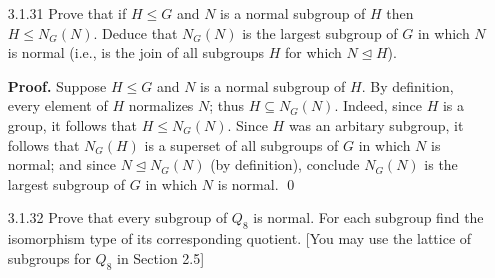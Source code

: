 \begin{enumerate}
      \textbf{Proof.} ($\Rightarrow$) Suppose first that $gN = Ng$. Let
      $n \in N$. Then since $ng \in Ng$ and $gN = Ng$, it follows that
      $ng = gn'$ for some $n' \in N$, so that $n = gn'g^{-1} \in gNg^{-1}$;
      i.e., $N \subseteq gNg^{-1}$. Now consider $m \in gNg^{-1}$. It follows
      that $m = gn''g^{-1}$ for some $n'' \in N$. Similarly, since $gn'' \in gN$
      and $gN = Ng$, we have that $gn'' = n_1g$ for some $n_1 \in N$, so that
      $m = gn''g^{-1} = n_1 \in N$. Thus, $gNg^{-1} \subseteq N$; conclude that
      $gNg^{-1} = N$; in other words, $g \in N_G(N)$.

      ($\Leftarrow$) Now suppose that $g \in N_G(N)$. By definition, we have
      that $gNg^{-1} = N$. Let $m \in gN$, so that $m = gn$ for some $n \in N$.
      It follows that $gng^{-1} = n'$ for some $n' \in N$ (because
      $gNg^{-1} = N$), so that $m = gn = n'g \in Ng$; that is $gN \subseteq Ng$.
      By a symmetric argument, we conclude that $Ng \subseteq gN$, so that
      $gN = Ng$. \qed
   \item[3.1.31]  Prove that if $H \le G$ and $N$ is a normal subgroup of $H$
                  then $H \le N_G(N)$. Deduce that $N_G(N)$ is the largest
                  subgroup of $G$ in which $N$ is normal (i.e., is the join of
                  all subgroups $H$ for which $N \trianglelefteq H$).

      \textbf{Proof.} Suppose $H \le G$ and $N$ is a normal subgroup of $H$. By
      definition, every element of $H$ normalizes $N$; thus
      $H \subseteq N_G(N)$. Indeed, since $H$ is a group, it follows that
      $H \le N_G(N)$. Since $H$ was an arbitary subgroup, it follows that
      $N_G(H)$ is a superset of all subgroups of $G$ in which $N$ is normal; and
      since $N \trianglelefteq N_G(N)$ (by definition), conclude $N_G(N)$ is the 
      largest subgroup of $G$ in which $N$ is normal. \qed
   \item[3.1.32]  Prove that every subgroup of $Q_8$ is normal. For each
                  subgroup find the isomorphism type of its corresponding
                  quotient. [You may use the lattice of subgroups for $Q_8$ in
                  Section 2.5]


\end{enumerate}
